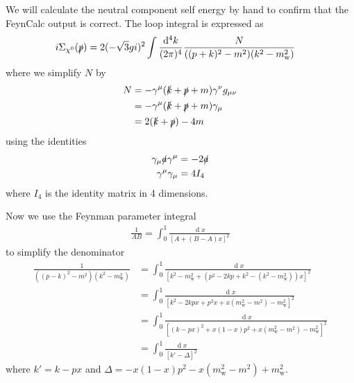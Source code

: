 \documentclass[11pt]{article}
\def\sp{\slashed{p}}
\def\sk{\slashed{k}}
\def\cn{\chi^0}
\def\gm{\gamma^{\mu}}
\def\gn{\gamma^{\nu}}
\def\gp{\gamma^{\rho}}
\def\km{k_{\mu}}
\def\kn{k_{\nu}}
\def\kp{k_{\rho}}
\renewcommand{\d}{\ensuremath{\operatorname{d}\!}}
\begin{document}
We will calculate the neutral component self energy by hand to confirm that the FeynCalc output is correct.  The loop integral is expressed as
\begin{align}
i\Sigma_{\cn}(\slashed{p})&= 2(-\sqrt{3}gi)^2 \int \frac{\d^4k}{(2\pi)^4} \frac{N}{((p+k)^2-m^2)(k^2-m_{\text{w}}^2)}
\end{align}
where we simplify $N$ by
\begin{align*}
N&=-\gm(\sk+\sp+m)\gn g_{\mu\nu}\\
&=-\gm(\sk+\sp+m)\gamma_{\mu}\\
&=2(\sk+\sp)-4m
\end{align*}
using the identities
\begin{align}
\begin{split}
\gamma_{\mu}\slashed{a}\gm&=-2\slashed{a}\\
\gm\gamma_{\mu}&=4I_4
\end{split}
\end{align}
where $I_4$ is the identity matrix in 4 dimensions.

Now we use the Feynman parameter integral
\begin{align}
\frac{1}{AB}=\int_0^1 \frac{\d x}{[A+(B-A)x]^2}
\end{align}
to simplify the denominator
\begin{align*}
 \frac{1}{((p-k)^2-m^2)(k^2-m_{\text{w}}^2)}&=\int_0^1\frac{\d x}{[k^2-m_{\text{w}}^2+(p^2-2kp+k^2-(k^2-m_{\text{w}}^2))x]^2}\\
&=\int_0^1\frac{\d x}{[ k^2-2kpx+p^2x+x(m_{\text{w}}^2-m^2)-m_{\text{w}}^2]^2}\\
&=\int_0^1\frac{\d x}{[ (k-px)^2+x(1-x)p^2+x(m_{\text{w}}^2-m^2)-m_{\text{w}}^2]^2}\\
&=\int_0^1\frac{\d x}{[ k'-\Delta]^2}
\end{align*}
where $k'=k-px$ and $\Delta=-x(1-x)p^2-x(m_{\text{w}}^2-m^2)+m_{\text{w}}^2$.
\end{document}

